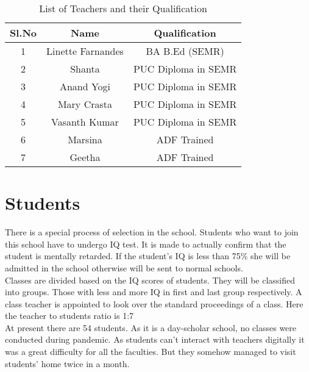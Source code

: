 \begin{table}[H]   
\centering
   \begin{tabular}{|c|c|c|}\hline 
       \textbf{Sl.No} & \textbf{Name} & \textbf{Qualification}  \\ \hline 
       1 & Linette Farnandes & BA B.Ed (SEMR)\\ \hline
       2 & Shanta & PUC Diploma in SEMR \\ \hline 
        3 & Anand Yogi & PUC Diploma in SEMR \\ \hline 
       4 & Mary Crasta & PUC Diploma in SEMR \\ \hline 
       5 & Vasanth Kumar & PUC Diploma in SEMR \\ \hline   
       6 & Marsina & ADF Trained \\ \hline 
       7 & Geetha & ADF Trained \\ \hline 
     \end{tabular}
\caption*{List of Teachers and their Qualification}
\end{table}

\section{Students}
There is a special process of selection in the school. Students who want to join this school have to undergo IQ test. It is made to actually confirm that the student is mentally retarded. If the student's IQ is less than 75\% she will be admitted in the school otherwise will be sent to normal schools. \\

\noindent Classes are divided based on the IQ scores of students. They will be classified into groups. Those with less and more IQ in first and last group respectively. A class teacher is appointed to look over the standard proceedings of a class. Here the teacher to students ratio is 1:7\\

At present there are 54 students. As it is a day-scholar school, no classes were conducted during pandemic. As students can't interact with teachers digitally it was a great difficulty for all the faculties. But they somehow managed to visit students' home twice in a month.

